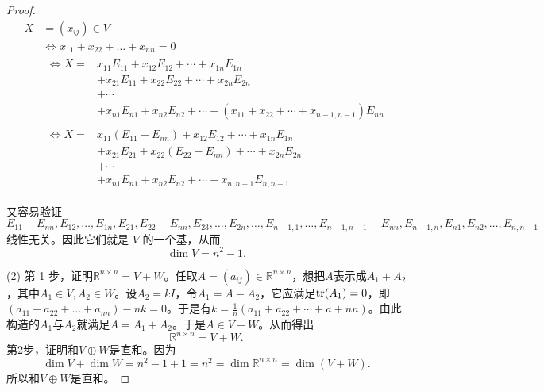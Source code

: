 \begin{enumerate}[1~]
\begin{proof}
\begin{align*}
X&=(x_{ij})\in V\\
&\Longleftrightarrow x _ { 11 } + x _ { 22 } + \dots + x _ { n n } = 0\\
& \begin{aligned} \Longleftrightarrow X  = & x _ { 11 } E _ { 11 } + x _ { 12 } E _ { 12 } + \cdots + x _ { 1 n } E _ { 1 n } \\ & + x _ { 21 } E _ { 11 } + x _ { 22 } E _ { 22 } + \cdots + x _ { 2 n } E _ { 2 n } \\ & + \cdots \\ & + x _ { n 1 } E _ { n 1 } + x _ { n 2 } E _ { n 2 } + \cdots - \left( x _ { 11 } + x _ { 22 } + \cdots + x _ { n - 1 , n - 1 } \right) E _ { n n } \end{aligned}\\
& \begin{aligned}\Longleftrightarrow X = & x _ { 11 } \left( E _ { 11 } - E _ { n n } \right) + x _ { 12 } E _ { 12 } + \cdots + x _ { 1 n } E _ { 1 n } \\ & + x _ { 21 } E _ { 21 } + x _ { 22 } \left( E _ { 22 } - E _ { n n } \right) + \cdots + x _ { 2 n } E _ { 2 n } \\ & + \cdots \\ & + x _ { n 1 } E _ { n 1 } + x _ { n 2 } E _ { n 2 } + \cdots + x _ { n , n - 1 } E _ { n , n - 1 } \end{aligned}
\end{align*}

又容易验证 $E _ { 11 } - E _ { n n } , E _ { 12 } , \dots , E _ { 1 n } , E _ { 21 } , E _ { 22 } - E _ { n n } , E _ { 23 } , \dots , E _ { 2 n } , \dots , E _ { n - 1,1 } , \dots , E _ { n - 1 , n - 1 } - E _ { n n }, E _ { n - 1 , n } , E _ { n 1 } , E _ { n 2 } , \dots , E _ { n , n - 1 }$ 线性无关。因此它们就是 $V$ 的一个基，从而
\[
\dim V=n^2-1.
\]

(2) 第 1 步，证明$\mathbb{R}^{n\times n}=V+W$。任取$A=(a_{ij})\in \mathbb{R}^{n\times n}$，想把$A$表示成$A_1+A_2$，其中$A_1\in V, A_2\in W$。设$A_2=kI$，令$A_1=A-A_2$，它应满足${\rm tr}(A_1)=0$，即
$\left( a _ { 11 } + a _ { 22 } + \dots + a _ { n n } \right) - n k = 0$。于是有$k=\frac{1}{n}(a_{11}+a_{22} +\cdots+a+{nn})$。由此构造的$A_1$与$A_2$就满足$A=A_1+A_2$。于是$A\in V+W$。从而得出\[
\mathbb{R}^{n\times n}=V+W.
\]
第2步，证明和$V\oplus W$是直和。因为\[
\dim V+\dim W=n^2-1+1=n^2=\dim \mathbb{R}^{n\times n}=\dim(V+W).\]
所以和$V\oplus W$是直和。
\end{proof}


\end{enumerate}
